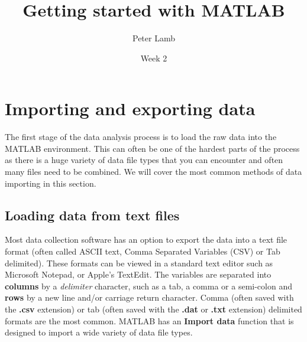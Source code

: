 \documentclass[12pt,a4paper]{article}
\title{Getting started with MATLAB}
\author{Peter Lamb}
\date{Week 2}
\begin{document}
\maketitle

\section{Importing and exporting data}
The first stage of the data analysis process is to load the raw data into the MATLAB environment.  
This can often be one of the hardest parts of the process as there is a huge variety of data file types that you can encounter and often many files need to be combined.  
We will cover the most common methods of data importing in this section.

\subsection{Loading data from text files}
Most data collection software has an option to export the data into a text file format (often called ASCII text, Comma Separated Variables (CSV) or Tab delimited).  
These formats can be viewed in a standard text editor such as Microsoft Notepad, or Apple's TextEdit.  
The variables are separated into \textbf{columns} by a \emph{delimiter} character, such as a tab, a comma or a semi-colon and \textbf{rows} by a new line and/or carriage return character. 
Comma (often saved with the \textbf{.csv} extension) or tab (often saved with the \textbf{.dat} or \textbf{.txt} extension) delimited formats are the most common.  
MATLAB has an \textbf{Import data} function that is designed to import a wide variety of data file types.

\end{document}
